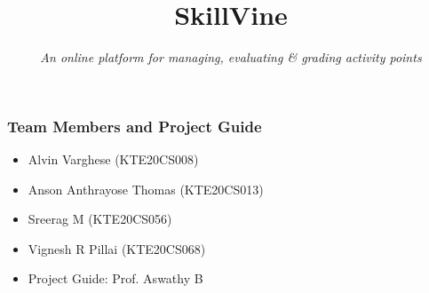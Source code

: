 \documentclass{beamer}
\title[SkillVine]{\textbf{SkillVine}}
\subtitle{\textit{An online platform for managing, evaluating \& grading activity points}}
\date{}
\begin{document}
{
\begin{frame}[plain]
  \vspace{60pt}
  \centering
  \maketitle
\end{frame}
}

{
\begin{frame}
  \frametitle{Team Members and Project Guide}
  \begin{itemize}
    \item Alvin Varghese (KTE20CS008)
    \item Anson Anthrayose Thomas (KTE20CS013)
    \item Sreerag M (KTE20CS056)
    \item Vignesh R Pillai (KTE20CS068)
    \vspace{10pt}
    \item Project Guide: Prof. Aswathy B
  \end{itemize}
\end{frame}
}
\end{document}
